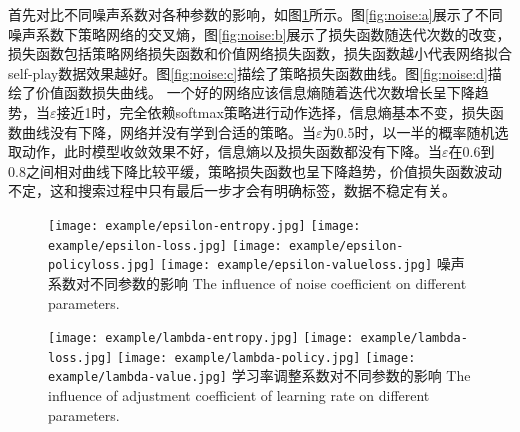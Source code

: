 首先对比不同噪声系数对各种参数的影响，如图\ref{fig:noise}所示。图\ref{fig:noise:a}展示了不同噪声系数下策略网络的交叉熵，图\ref{fig:noise:b}展示了损失函数随迭代次数的改变，损失函数包括策略网络损失函数和价值网络损失函数，损失函数越小代表网络拟合self-play数据效果越好。图\ref{fig:noise:c}描绘了策略损失函数曲线。图\ref{fig:noise:d}描绘了价值函数损失曲线。
一个好的网络应该信息熵随着迭代次数增长呈下降趋势，当$\varepsilon$接近1时，完全依赖softmax策略进行动作选择，信息熵基本不变，损失函数曲线没有下降，网络并没有学到合适的策略。当$\varepsilon$为0.5时，以一半的概率随机选取动作，此时模型收敛效果不好，信息熵以及损失函数都没有下降。当$\varepsilon$在0.6到0.8之间相对曲线下降比较平缓，策略损失函数也呈下降趋势，价值损失函数波动不定，这和搜索过程中只有最后一步才会有明确标签，数据不稳定有关。

\begin{figure}[htpb]
	\centering
	{\texttt{[image: example/epsilon-entropy.jpg]}}
	\hspace{0.5em}
	{\texttt{[image: example/epsilon-loss.jpg]}}
	\newline
	\centering
	{\texttt{[image: example/epsilon-policyloss.jpg]}}
	\hspace{0.5em}
	{\texttt{[image: example/epsilon-valueloss.jpg]}}
	\bicaption
	{噪声系数对不同参数的影响}
	{The influence of noise coefficient on different parameters.}
	\label{fig:noise}
\end{figure}

\begin{figure}[hbpt]
	\centering
	{\texttt{[image: example/lambda-entropy.jpg]}}
	{\texttt{[image: example/lambda-loss.jpg]}}
	\newline
	\centering
	{\texttt{[image: example/lambda-policy.jpg]}}
	{\texttt{[image: example/lambda-value.jpg]}}
	\bicaption
	{学习率调整系数对不同参数的影响}
	{The influence of adjustment coefficient of learning rate on different parameters.}
	\label{fig2response}
\end{figure}

